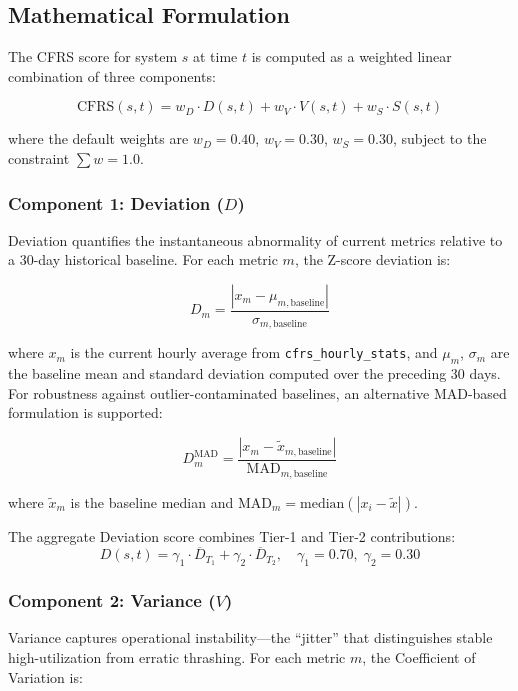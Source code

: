\documentclass{ieeeaccess}
\begin{document}
\subsection{Mathematical Formulation}
The CFRS score for system $s$ at time $t$ is computed as a weighted linear combination of three components:

\begin{equation}
\text{CFRS}(s, t) = w_D \cdot D(s,t) + w_V \cdot V(s,t) + w_S \cdot S(s,t)
\label{eq:cfrs}
\end{equation}

where the default weights are $w_D = 0.40$, $w_V = 0.30$, $w_S = 0.30$, subject to the constraint $\sum w = 1.0$.

\subsubsection{Component 1: Deviation ($D$)}
Deviation quantifies the instantaneous abnormality of current metrics relative to a 30-day historical baseline. For each metric $m$, the Z-score deviation is:

\begin{equation}
D_m = \frac{|x_m - \mu_{m,\text{baseline}}|}{\sigma_{m,\text{baseline}}}
\label{eq:deviation}
\end{equation}

where $x_m$ is the current hourly average from \texttt{cfrs\_hourly\_stats}, and $\mu_m$, $\sigma_m$ are the baseline mean and standard deviation computed over the preceding 30 days. For robustness against outlier-contaminated baselines, an alternative MAD-based formulation is supported:

\begin{equation}
D_m^{\text{MAD}} = \frac{|x_m - \tilde{x}_{m,\text{baseline}}|}{\text{MAD}_{m,\text{baseline}}}
\label{eq:mad}
\end{equation}

where $\tilde{x}_m$ is the baseline median and $\text{MAD}_m = \text{median}(|x_i - \tilde{x}|)$.

The aggregate Deviation score combines Tier-1 and Tier-2 contributions:
\begin{equation}
D(s,t) = \gamma_1 \cdot \overline{D}_{T_1} + \gamma_2 \cdot \overline{D}_{T_2}, \quad \gamma_1 = 0.70, \; \gamma_2 = 0.30
\end{equation}

\subsubsection{Component 2: Variance ($V$)}
Variance captures operational instability---the ``jitter'' that distinguishes stable high-utilization from erratic thrashing. For each metric $m$, the Coefficient of Variation is:
\end{document}
